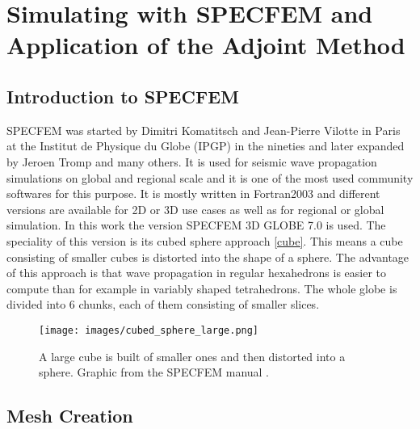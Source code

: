 


\section{Simulating with SPECFEM and Application of the Adjoint Method}

\subsection{Introduction to SPECFEM}

SPECFEM was started by Dimitri Komatitsch and Jean-Pierre Vilotte in Paris at the 
Institut de Physique du Globe (IPGP) \citep{Vilotte1998} in the nineties and later expanded by Jeroen Tromp and many others. 
It is used for seismic wave propagation simulations on global and regional scale and it is one of the 
most used community softwares for this purpose. 
It is mostly written in Fortran2003 and different versions are available for 2D or 3D use cases as well
as for regional or global simulation. 
In this work the version SPECFEM 3D GLOBE 7.0 is used.
The speciality of this version is its cubed sphere approach \autoref{cube}.
This means a cube consisting of smaller cubes is distorted into the shape of a sphere.
The advantage of this approach is that wave propagation in regular hexahedrons is easier to compute than
for example in variably shaped tetrahedrons. %
The whole globe is divided into 6 chunks, each of them consisting of smaller slices.



\begin{figure}[h]
\begin{center}
\texttt{[image: images/cubed\_sphere\_large.png]}
\caption[The cubed sphere method.]{A large cube is built of smaller ones and then distorted into a sphere.
Graphic from the SPECFEM manual \citep{specfem_manual}.}
\label{cube}
\end{center}
\end{figure}


\subsection{Mesh Creation}

